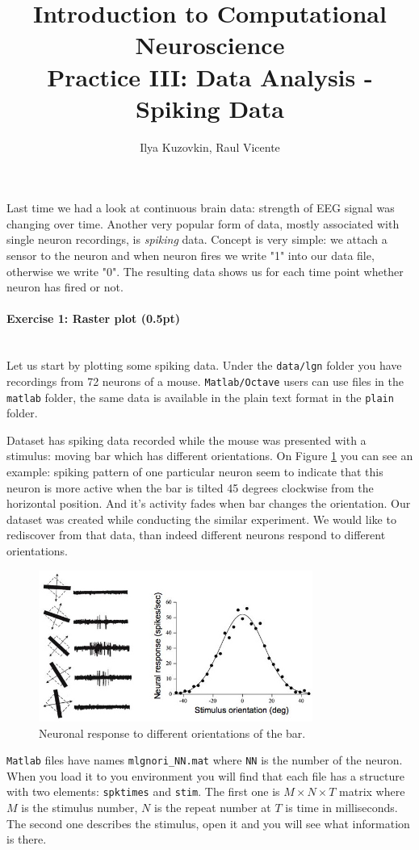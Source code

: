 \documentclass[a4paper,11pt]{article}
\author{\large{Ilya Kuzovkin, Raul Vicente}}
\title{\huge{Introduction to Computational Neuroscience}\\\LARGE{Practice III: Data Analysis - Spiking Data}}
\newenvironment{exercise}[3]{\paragraph{Exercise #1: #2 (#3pt)}\ \\}{
\medskip}
\begin{document}
\maketitle

Last time we had a look at continuous brain data: strength of EEG signal was changing over time. Another very popular form of data, mostly associated with single neuron recordings, is \emph{spiking} data. Concept is very simple: we attach a sensor to the neuron and when neuron fires we write "1" into our data file, otherwise we write "0". The resulting data shows us for each time point whether neuron has fired or not.

\begin{exercise}{1}{Raster plot}{0.5}
Let us start by plotting some spiking data. Under the \texttt{data/lgn} folder you have recordings from 72 neurons of a mouse. \texttt{Matlab/Octave} users can use files in the \texttt{matlab} folder, the same data is available in the plain text format in the \texttt{plain} folder.

Dataset has spiking data recorded while the mouse was presented with a stimulus: moving bar which has different orientations. On Figure \ref{fig:lgnstimulus} you can see an example: spiking pattern of one particular neuron seem to indicate that this 
neuron is more active when the bar is tilted 45 degrees clockwise from the horizontal position. And it's activity fades when bar changes the orientation. Our dataset was created while conducting the similar experiment. We would like to rediscover from that data, than indeed different neurons respond to different orientations.
\begin{figure}[H]
   \centering
   \includegraphics[width=0.8\textwidth]{orientation.jpg} 
   \caption{Neuronal response to different orientations of the bar.}
   \label{fig:lgnstimulus}
\end{figure}

\texttt{Matlab} files have names \texttt{mlgnori\_NN.mat} where \texttt{NN} is the number of the neuron. When you load it to you environment you will find that each file has a structure with two elements: \texttt{spktimes} and \texttt{stim}. The first one is $M\times N \times T$ matrix where $M$ is the stimulus number, $N$ is the repeat number at $T$ is time in milliseconds. The second one describes the stimulus, open it and you will see what information is there.


\end{exercise}
\end{document}
